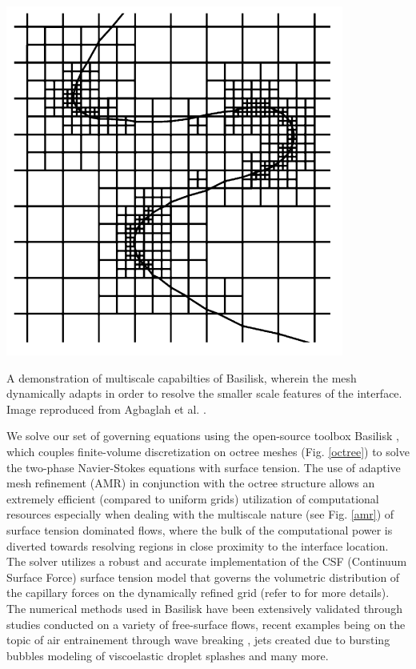 \begin{marginfigure}
\centering
\includegraphics{plots/ligament_breakup/multi_scale.png}
\caption{ A demonstration of multiscale capabilties
of Basilisk, wherein the mesh dynamically adapts in order
to resolve the smaller scale features of the interface. 
Image reproduced from Agbaglah et al. \cite{agbag}.
}
\label{amr}
\end{marginfigure}


We solve our set of governing equations using the open-source toolbox 
Basilisk \cite{basilisk}, which couples finite-volume discretization 
on octree meshes (Fig. \ref{octree}) to solve the two-phase 
Navier-Stokes equations with surface tension.
The use of adaptive mesh refinement (AMR) in conjunction with the octree structure
allows an extremely efficient (compared to uniform grids) utilization of 
computational resources especially when dealing with the multiscale nature (see Fig. \ref{amr}) 
of surface tension dominated flows, where the bulk of the computational power
is diverted towards resolving regions in close proximity to the interface location. 
The solver utilizes a robust and accurate implementation 
of the CSF \cite{csf} (Continuum Surface Force) surface tension model 
that governs the volumetric distribution of the capillary forces on the dynamically 
refined grid (refer to \cite{popinet2009accurate} for more details). 
The numerical methods used in Basilisk have been extensively validated
through studies conducted on a variety of free-surface flows, 
recent examples being on the topic of air entrainement through wave breaking
\cite{basilisk_1, basilisk_3}, jets created due to bursting bubbles \cite{basilisk_2, basilisk_5}
modeling of viscoelastic droplet splashes \cite{basilisk_4} and many more.


